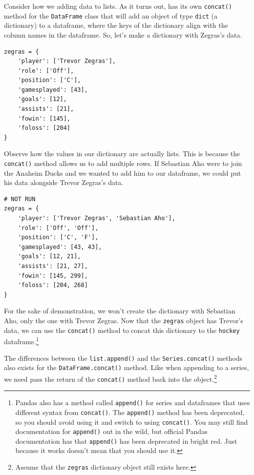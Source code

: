\vspace{5mm}
Consider how we adding data to lists. As it turns out,  has its own \verb|concat()| method for the \verb|DataFrame| class that will add an object of type \verb|dict| (a dictionary) to a  dataframe, where the keys of the dictionary align with the column names in the dataframe. So, let's make a dictionary with Zegras's data.
\begin{lstlisting}[style=pippython]
zegras = {
	'player': ['Trevor Zegras'],
	'role': ['Off'],
	'position': ['C'],
	'gamesplayed': [43],
	'goals': [12],
	'assists': [21],
	'fowin': [145],
	'foloss': [204]
}
\end{lstlisting}
Observe how the values in our dictionary are actually lists. This is because the \verb|concat()| method allows us to add multiple rows. If Sebastian Aho were to join the Anaheim Ducks and we wanted to add him to our dataframe, we could put his data alongside Trevor Zegras's data.\par
\begin{lstlisting}[style=pippython]
# NOT RUN
zegras = {
	'player': ['Trevor Zegras', 'Sebastian Aho'],
	'role': ['Off', 'Off'],
	'position': ['C', 'F'],
	'gamesplayed': [43, 43],
	'goals': [12, 21],
	'assists': [21, 27],
	'fowin': [145, 299],
	'foloss': [204, 268]
}
\end{lstlisting}
For the sake of demonstration, we won't create the dictionary with Sebastian Aho, only the one with Trevor Zegras. Now that the \verb|zegras| object has Trevor's data, we can use the \verb|concat()| method to concat this dictionary to the \verb|hockey| dataframe.\cprotect\footnote{Pandas also has a method called \verb|append()| for series and dataframes that uses different syntax from \verb|concat()|. The \verb|append()| method has been deprecated, so you should avoid using it and switch to using \verb|concat()|. You may still find documentation for \verb|append()| out in the wild, but official Pandas documentation has that \verb|append()| has been deprecated in bright red. Just because it works doesn't mean that you should use it.}\par
The differences between the \verb|list.append()| and the \verb|Series.concat()| methods also exists for the \verb|DataFrame.concat()| method. Like when appending to a series, we need pass the return of the \verb|concat()| method back into the object.\cprotect\footnote{Assume that the \verb|zegras| dictionary object still exists here.}\par
